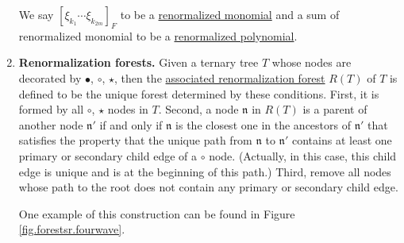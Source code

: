 \begin{defn}
\begin{enumerate}
 We say $[\xi_{k_1}\cdots \xi_{k_{2m}}]_{F}$ to be a \underline{renormalized monomial} and a sum of renormalized monomial to be a \underline{renormalized polynomial}. 
 \item \textbf{Renormalization forests.} Given a ternary tree $T$ whose nodes are decorated by $\bullet$, $\circ$, $\star$, then the \underline{associated renormalization forest} $R(T)$ of $T$ is defined to be the unique forest determined by these conditions. First, it is formed by all $\circ$, $\star$ nodes in $T$. Second, a node $\mathfrak{n}$ in $R(T)$ is a parent of another node $\mathfrak{n}'$ if and only if $\mathfrak{n}$ is the closest one in the ancestors of $\mathfrak{n}'$ that satisfies the property that the unique path from $\mathfrak{n}$ to $\mathfrak{n}'$ contains at least one primary or secondary child edge of a $\circ$ node. (Actually, in this case, this child edge is unique and is at the beginning of this path.) Third, remove all nodes whose path to the root does not contain any primary or secondary child edge. 
 
 One example of this construction can be found in Figure \ref{fig.forestsr.fourwave}.
 
 \begin{figure}[H]
 \centering
\end{figure}
\end{enumerate}
\end{defn}
